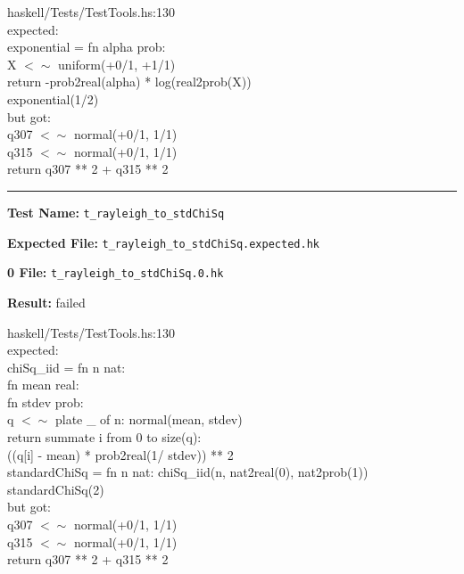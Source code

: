 \documentclass[11pt]{article}
\begin{document}
\bigskip
\noindent
haskell/Tests/TestTools.hs:130\\expected:\\exponential = fn alpha prob:\\              X $<\sim$ uniform(+0/1, +1/1)\\              return -prob2real(alpha) * log(real2prob(X))\\exponential(1/2)\\but got:\\q307 $<\sim$ normal(+0/1, 1/1)\\q315 $<\sim$ normal(+0/1, 1/1)\\return q307 ** 2 + q315 ** 2\\

\hrule

\bigskip
\textbf{Test Name:} {\tt t\_rayleigh\_to\_stdChiSq}

\textbf{Expected File:} {\tt t\_rayleigh\_to\_stdChiSq.expected.hk}

\bigskip


\bigskip
\textbf{0 File:} {\tt t\_rayleigh\_to\_stdChiSq.0.hk}

\bigskip


\bigskip
\textbf{Result:} failed

\bigskip
\noindent
haskell/Tests/TestTools.hs:130\\expected:\\chiSq\_iid = fn n nat:\\            fn mean real:\\            fn stdev prob:\\            q $<\sim$ plate \_ of n: normal(mean, stdev)\\            return summate i from 0 to size(q):\\                   ((q[i] - mean) * prob2real(1/ stdev)) ** 2\\standardChiSq = fn n nat: chiSq\_iid(n, nat2real(0), nat2prob(1))\\standardChiSq(2)\\but got:\\q307 $<\sim$ normal(+0/1, 1/1)\\q315 $<\sim$ normal(+0/1, 1/1)\\return q307 ** 2 + q315 ** 2\\
\end{document}
